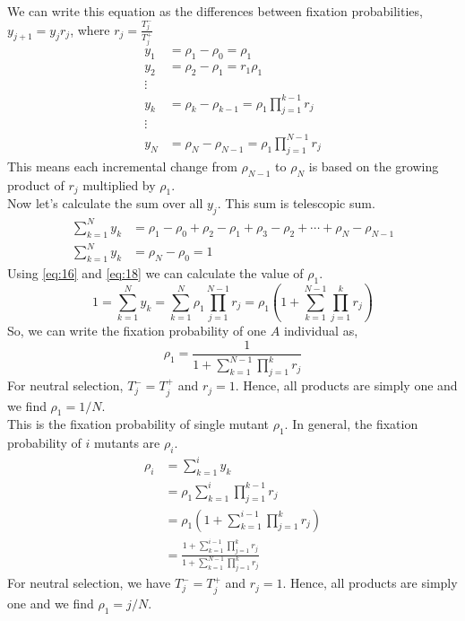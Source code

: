 \documentclass{article}
\begin{document}
We can write this equation as the differences between fixation probabilities, $y_{j+1}=y_jr_j$, where $r_j=\frac{T_j^-}{T_j^+}$
\begin{align}
y_1 &= \rho_1 - \rho_0 = \rho_1 \nonumber\\
y_2 &= \rho_2 - \rho_1 = r_1 \rho_1 \nonumber\\
\vdots \nonumber\\
y_k &= \rho_k - \rho_{k-1} = \rho_1 \prod_{j=1}^{k-1} r_j \label{eq:17}\\
\vdots \nonumber\\
y_N &= \rho_N - \rho_{N-1} = \rho_1 \prod_{j=1}^{N-1} r_j \label{eq:18}
\end{align}
This means each incremental change from $\rho_{N-1}$ to $\rho_N$ is based on the growing product of $r_j$ multiplied by $\rho_1$.\\
Now let's calculate the sum over all $y_j$. This sum is telescopic sum.
\begin{align}
\sum_{k=1}^N y_k &= \rho_1-\rho_0+ \rho_2-\rho_1+ \rho_3-\rho_2+\cdots+\rho_N-\rho_{N-1} \nonumber\\
\sum_{k=1}^N y_k &= \rho_N-\rho_0=1 \label{eq:19}
\end{align}
Using \eqref{eq:16} and \eqref{eq:18} we can calculate the value of $\rho_1$.
\begin{equation}
1=\sum_{k=1}^N y_k=\sum_{k=1}^N \rho_1 \prod_{j=1}^{N-1}r_j=\rho_1(1+ \sum_{k=1}^{N-1}\prod_{j=1}^k r_j)\label{eq:20}
\end{equation}
So, we can write the fixation probability of one $A$ individual as,
\begin{equation}
\rho_1= \frac{1}{1+ \sum_{k=1}^{N-1}\prod_{j=1}^k r_j} \label{eq:21}
\end{equation}
For neutral selection, $T_j^-=T_j^+$ and $r_j=1$. Hence, all products are simply one and we find $\rho_1= 1/N$.\\
This is the fixation probability of single mutant $\rho_1$. In general, the fixation probability of $i$ mutants are $\rho_i$.
\begin{align}
\rho_i&= \sum_{k=1}^i y_k \nonumber\\
&= \rho_1 \sum_{k=1}^i \prod_{j=1}^{k-1}r_j\nonumber\\
&=\rho_1(1+ \sum_{k=1}^{i-1} \prod_{j=1}^k r_j)\nonumber\\
&= \frac{1+\sum_{k=1}^{i-1}\prod_{j=1}^k r_j}{1+ \sum_{k=1}^{N-1}\prod_{j=1}^k r_j} \label{eq:22}
\end{align}
For neutral selection, we have $T_j^-=T_j^+$ and $r_j=1$. Hence, all products are simply one and we find $\rho_1= j/N$.\\
\end{document}
